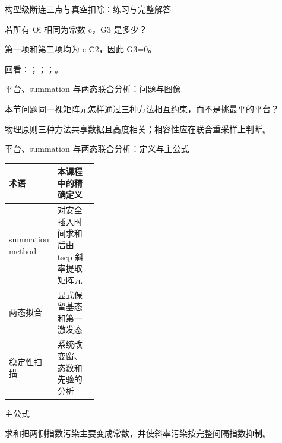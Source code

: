 \begin{frame}[t]{构型级断连三点与真空扣除：练习与完整解答}
\footnotesize
\begin{block}{}若所有 Oi 相同为常数 c，G3 是多少？\end{block}
\begin{exampleblock}{}第一项和第二项均为 c C̄2，因此 G3=0。\end{exampleblock}
\vfill
\scriptsize 回看：；；；。
\end{frame}

\begin{frame}[t]{平台、summation 与两态联合分析：问题与图像}
\footnotesize
\begin{block}{本节问题}同一裸矩阵元怎样通过三种方法相互约束，而不是挑最平的平台？\end{block}
\begin{block}{物理原则}\quad 三种方法共享数据且高度相关；相容性应在联合重采样上判断。\end{block}
\end{frame}

\begin{frame}[t]{平台、summation 与两态联合分析：定义与主公式}
\footnotesize\begin{tabularx}{\linewidth}{p{0.30\linewidth}Y}
\toprule 术语 & 本课程中的精确定义\\\midrule
{} summation method & 对安全插入时间求和后由 tsep 斜率提取矩阵元\\
 两态拟合 & 显式保留基态和第一激发态\\
 稳定性扫描 & 系统改变窗、态数和先验的分析\\
\bottomrule\end{tabularx}\vspace{0.15cm}
\begin{block}{ 主公式}\centering{}\end{block}
求和把两侧指数污染主要变成常数，并使斜率污染按完整间隔指数抑制。
\end{frame}

